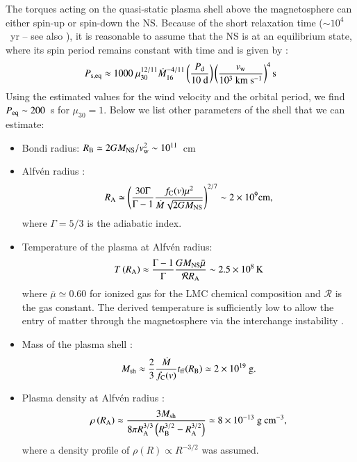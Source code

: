 \documentclass[a4paper,fleqn,usenatbib]{mnras}
\newcommand{\eqb}{\begin{eqnarray}}
\newcommand{\eqe}{\end{eqnarray}}
\begin{document}
The torques acting on the quasi-static plasma shell above the magnetosphere can either spin-up or spin-down the NS. Because of the short relaxation time ($\sim$$10^4$~yr -- see also \citealt{2017MNRAS.469.3056S}), it is reasonable to assume that the NS is at an equilibrium state, where its spin period remains constant with time and is given by \citep{2012MNRAS.420..216S,2017arXiv170203393S}:
\eqb
P_{\rm s,eq} \approx 1000 \ \mu_{30}^{12/11} \dot{M}_{16}^{-4/11} \left( \frac{P_{\rm d}}{10 \ {\rm d}}\right) \left(\frac{v_{\rm w}}{10^3 \ {\rm km \ s^{-1}}}\right)^4 {\rm s}
\label{eq:peq}
\eqe 
Using the estimated values for the wind velocity and the orbital period, we find $P_{\rm eq} \sim 200$~s for $\mu_{30}=1$. Below we list other parameters of the shell that we can estimate:
\begin{itemize}
 \item Bondi radius: $R_{\rm B}\simeq 2 G M_{\rm NS}/v_{\rm w}^2 \sim 10^{11}$~cm
 \item Alfv{\'e}n radius \citep{2012MNRAS.420..216S,2017arXiv170203393S}: 
 \eqb 
 R_{\rm A}\simeq \left( \frac{30  \Gamma}{\Gamma -1} \frac{f_{\rm C}(v) \mu^2}{\dot{M} \sqrt{2GM_{\rm NS}}}\right)^{2/7} \sim 2\times 10^9 {\rm cm},
 \eqe 
 where $\Gamma=5/3$ is the adiabatic index.
 \item Temperature of the plasma at  Alfv{\'e}n  radius: 
 \eqb 
 T\left(R_{\rm A}\right) \approx \frac{\Gamma-1}{\Gamma}\frac{GM_{\rm NS}\bar{\mu}}{\mathcal{R} R_{\rm A}} \sim 2.5\times 10^8 \, {\rm K} 
 \eqe 
 where $\bar{\mu}\simeq 0.60$ for ionized gas for the LMC chemical composition \citep{2002A&A...396...53R} and $\mathcal{R}$ is the gas constant. The derived temperature is sufficiently low to allow the entry of matter through the magnetosphere via the interchange instability \citep[see][]{2012MNRAS.420..216S}.  
 \item Mass of the plasma shell \citep{2014MNRAS.442.2325S}:
 \eqb 
 M_{\rm sh}\approx \frac{2}{3}\frac{\dot{M}}{f_{\rm C}(v)}t_{\rm ff}(R_{\rm B}) \simeq 2\times 10^{19} \ {\rm g}.
 \eqe 
 \item Plasma density at Alfv{\'e}n radius \citep{2012MNRAS.420..216S}: 
 \eqb 
 \rho\left(R_{\rm A}\right)\approx \frac{3 M_{\rm sh}}{8\pi R_{\rm A}^{3/3} \left(R_{\rm B}^{3/2}-R_{\rm A}^{3/2}\right)} \simeq 8\times 10^{-13} \ {\rm g \ cm^{-3}},
 \eqe
 where a density profile of $\rho (R) \propto R^{-3/2}$ was assumed.
 \end{itemize}
\end{document}
